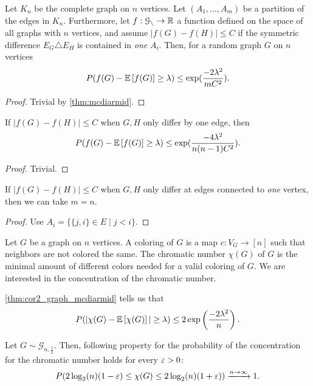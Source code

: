 \begin{lemma}
    Let $K_n$ be the complete graph on $n$ vertices.
    Let $(A_1, \dots, A_m)$ be a partition of the edges in $K_n$.
    Furthermore, let $f: \mathcal{G_n} \rightarrow \realnum$ a function defined on the space of all graphs with $n$ vertices,
    and assume $|f(G) - f(H)| \leq C$ if the symmetric difference $E_G \triangle E_H$
    is contained in \emph{one} $A_i$.
    Then, for a random graph $G$ on $n$ vertices
    \begin{align*}
        P(f(G) - \mathbb{E}\left[f(G)\right] \geq \lambda) \leq \exp(\frac{-2 \lambda^2}{mC^2}).
    \end{align*}
\end{lemma}
\begin{proof}
    Trivial by \autoref{thm:mcdiarmid}.
\end{proof}
\begin{corollary}
    If $|f(G) - f(H)| \leq C$ when $G,H$ only differ by one edge, then
    \begin{align*}
        P(f(G) - \mathbb{E}\left[f(G)\right] \geq \lambda) \leq \exp(\frac{-4 \lambda^2}{n(n-1)C^2}).
    \end{align*}
\end{corollary}
\begin{proof}
    Trivial.
\end{proof}
\begin{corollary} \label{thm:cor2_graph_mcdiarmid}
    If $|f(G) - f(H)| \leq C$ when $G,H$ only differ at edges connected to \emph{one} vertex,
    then we can take $m=n$.
\end{corollary}
\begin{proof}
    Use $A_i = \{ \{j,i\}\in E \mid j < i \}$.
\end{proof}
\begin{problem}
Let $G$ be a graph on $n$ vertices.
A coloring of $G$ is a map $c: V_G \rightarrow [n]$
such that neighbors are not colored the same.
The chromatic number $\chi(G)$ of $G$ is the minimal amount of different colors needed
for a valid coloring of $G$.
We are interested in the concentration of the chromatic number.
\end{problem}
\autoref{thm:cor2_graph_mcdiarmid} tells us that
\begin{align*}
    P(|\chi(G) - \mathbb{E}\left[\chi(G)\right]| \geq \lambda) \leq 2\exp\left(\frac{-2\lambda^2}{n}\right).
\end{align*}
\begin{theorem}
    Let $G \sim \mathcal{G}_{n,\frac{1}{2}}$.
    Then, following property for the probability of the concentration for the chromatic number
    holds for every $\varepsilon > 0$:
    \begin{align*}
        P(2 \log_2(n)(1 - \varepsilon) \leq \chi(G) \leq 2 \log_2(n)(1+\varepsilon)) \xrightarrow{n \rightarrow \infty} 1.
    \end{align*}
\end{theorem}
